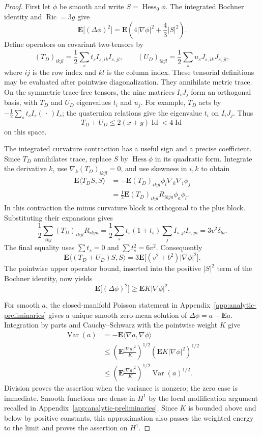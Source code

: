 \begin{proof}
First let $\phi$ be smooth and write
$S=\operatorname{Hess}_0\phi$. The integrated Bochner identity
and $\operatorname{Ric}=3g$ give
\[
 \mathbf E\bigl[(\Delta\phi)^2\bigr]
 =\mathbf E\left(4|\nabla\phi|^2+\frac43|S|^2\right).
\]
Define operators on covariant two-tensors by
\[
 (T_D)_{ikjl}=\frac12\sum_s t_s I_{s,ik}I_{s,jl},
 \qquad
 (U_D)_{ikjl}=\frac12\sum_s u_s J_{s,ik}J_{s,jl},
\]
where $ij$ is the row index and $kl$ is the column index.
These tensorial definitions may be evaluated after pointwise
diagonalization. They annihilate metric trace. On the symmetric
trace-free tensors, the nine matrices $I_iJ_j$ form an orthogonal
basis, with $T_D$ and $U_D$ eigenvalues $t_i$ and $u_j$.
For example, $T_D$ acts by
$-\frac12\sum_s t_s I_s(\,\cdot\,)I_s$; the quaternion relations
give the eigenvalue $t_i$ on $I_iJ_j$.
Thus
\[
 T_D+U_D\le 2(x+y)\operatorname{Id}<4\operatorname{Id}
\]
on this space.

The integrated curvature contraction has a useful sign and a precise
coefficient. Since $T_D$ annihilates trace, replace $S$ by
$\operatorname{Hess}\phi$ in its quadratic form. Integrate the
derivative $k$, use $\nabla_k(T_D)_{ikjl}=0$, and use skewness in
$i,k$ to obtain
\[
 \begin{aligned}
 \mathbf E\langle T_DS,S\rangle
 &=-\mathbf E (T_D)_{ikjl}\phi_l\nabla_k\nabla_i\phi_j\\
 &=\frac12\mathbf E (T_D)_{ikjl}R_{ikja}\phi_a\phi_l.
 \end{aligned}
\]
In this contraction the minus curvature block is orthogonal to the
plus block. Substituting their expansions gives
\[
 \frac12\sum_{ikj}(T_D)_{ikjl}R_{ikja}
 =\frac12\sum_s t_s(1+t_s)
                 \sum_j I_{s,jl}I_{s,ja}
 =3v^2\delta_{la}.
\]
The final equality uses $\sum t_s=0$ and $\sum t_s^2=6v^2$.
Consequently
\[
 \mathbf E\langle(T_D+U_D)S,S\rangle
 =3\mathbf E\bigl[(v^2+b^2)|\nabla\phi|^2\bigr].
\]
The pointwise upper operator bound, inserted into the positive
$|S|^2$ term of the Bochner identity, now yields
\[
 \mathbf E\bigl[(\Delta\phi)^2\bigr]\ge\mathbf E K|\nabla\phi|^2.
\]

For smooth $a$, the closed-manifold Poisson statement in
Appendix~\ref{app:analytic-preliminaries} gives a unique smooth
zero-mean solution of $\Delta\phi=a-\mathbf E a$. Integration
by parts and Cauchy--Schwarz with the pointwise weight $K$ give
\[
 \begin{aligned}
 \operatorname{Var}(a)
 &=-\mathbf E\langle\nabla a,\nabla\phi\rangle\\
 &\le
 \left(\mathbf E\frac{|\nabla a|^2}{K}\right)^{1/2}
 \left(\mathbf E K|\nabla\phi|^2\right)^{1/2}\\
 &\le
 \left(\mathbf E\frac{|\nabla a|^2}{K}\right)^{1/2}
 \operatorname{Var}(a)^{1/2}.
 \end{aligned}
\]
Division proves the assertion when the variance is nonzero; the
zero case is immediate. Smooth functions are dense in $H^1$ by the
local mollification argument recalled in
Appendix~\ref{app:analytic-preliminaries}. Since $K$ is bounded above
and below by positive constants, this approximation also passes the
weighted energy to the limit and proves the assertion on $H^1$.
\end{proof}

